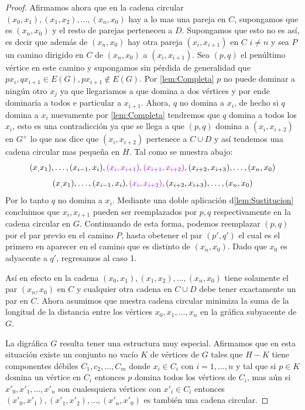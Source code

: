 \begin{proof}
Afirmamos ahora que en la cadena circular $(x_0,x_1),(x_1,x_2),\dots , (x_n,x_0)$ hay a lo mas una pareja en $C$, supongamos que es $(x_n,x_0)$ y el resto de parejas pertenecen a $D$. Supongamos que esto no es así, es decir que adem\'as de $(x_n,x_0)$ hay otra pareja $(x_i,x_{i+1})$ en $C$ $i\neq n$ y sea $P$ un camino dirigido en $C$ de $(x_n,x_0)$ a $(x_i,x_{i+1})$. Sea $(p,q)$ el penúltimo v\'ertice en este camino y supongamos sin p\'erdida de generalidad que $px_i,qx_{i+1}\in E(G), px_{i+1}\notin E(G)$. Por \cref{lem:Completa} $p$ no puede dominar a ningún otro $x_j$ ya que llegariamos a que domina a dos v\'ertices y por ende dominaría a todos e particular a $x_{i+1}$. Ahora, $q$ no domina a $x_i$, de hecho si $q$ domina a $x_i$ nuevamente por \cref{lem:Completa} tendremos que $q$ domina a todos los $x_i$, esto es una contradicci\'on ya que se llega a que $(p,q)$ domina a $(x_i,x_{i+2})$ en $G^+$ lo que nos dice que $(x_i,x_{i+2})$ pertenece a $C\cup D$ y así tendemos una cadena circular mas pequeña en $H$. Tal como se muestra abajo:
$$ (x_,x_1), \dots , (x_{i-1},x_i ), {\color{malva} (x_i,x_{i+1}), (x_{i+1},x_{i+2})},(x_{i+2},x_{i+3}), \dots , (x_n,x_0) $$
$$ (x_,x_1), \dots , (x_{i-1},x_i ), {\color{malva} (x_i,x_{i+2})},(x_{i+2},x_{i+3}), \dots , (x_n,x_0) $$
Por lo tanto $q$ no domina a $x_i$. Mediante una doble aplicaci\'on d\cref{lem:Sustitucion} concluimos que $x_i,x_{i+1}$ pueden ser reemplazados por $p,q$ respectivamente en la cadena circular en $G$. Continuando de esta forma, podemos reemplazar $(p,q)$ por el par previo en el camino $P$, hasta obetener el par $(p',q')$ el cual es el primero en aparecer en el camino que es distinto de $(x_n,x_0)$. Dado que $x_0$ es adyacente a $q'$, regresamos al caso 1.

Así en efecto en la cadena $(x_0,x_1),(x_1,x_2),\dots,(x_n,x_0)$ tiene solamente el par $(x_n,x_0)$ en $C$ y cualquier otra cadena en $C\cup D$ debe tener exactamente un par en $C$. Ahora asumimos que nuestra cadena circular minimiza la suma de la longitud de la distancia entre los vértices $x_0,x_1,\dots ,x_n$ en la gráfica subyacente de $G$.

La digráfica $G$ resulta tener una estructura muy especial. Afirmamos que en esta situación existe un conjunto no vac\'io $K$ de vértices de $G$ tales que $H-K$ tiene componentes d\'ebiles $C_1,c_2,\dots,C_m$ donde $x_i\in C_i$ con $i=1,\dots,n$ y tal que si $p\in K$ domina un vértice en $C_i$ entonces $p$ domina todos los vértices de $C_i$, mas aún si $x'_0,x'_1,\dots,x'_n$ son cualesquiera vértices con $x'_i\in C_i$ entonces $(x'_0,x'_1),(x'_1,x'_2),\dots,(x'_n,x'_0)$ es también una cadena circular.

\end{proof}